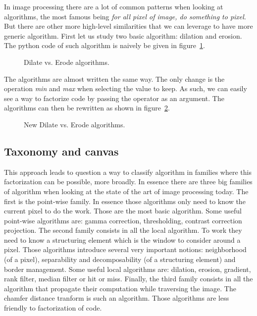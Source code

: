 In image processing there are a lot of common patterns when looking at algorithms, the most famous being \emph{for all
  pixel of image, do something to pixel}. But there are other more high-level similarities that we can leverage to have
more generic algorithm. First let us study two basic algorithm: dilation and erosion. The python code of such algorithm
is naively be given in figure~\ref{fig.erode.dilate}.

\begin{figure}[tbh]
  \centering
  \hfil
  \caption{Dilate vs. Erode algorithms.}
  \label{fig.erode.dilate}
\end{figure}

The algorithms are almost written the same way. The only change is the operation \emph{min} and \emph{max} when
selecting the value to keep. As such, we can easily see a way to factorize code by passing the operator as an argument.
The algorithms can then be rewritten as shown in figure~\ref{fig.erode.dilate.factorized}.

\begin{figure}[tbh]
  \centering
  \vfil
  \smallskip
  \hfil
  \caption{New Dilate vs. Erode algorithms.}
  \label{fig.erode.dilate.factorized}
\end{figure}

\subsection{Taxonomy and canvas}

This approach leads to question a way to classify algorithm in families where this factorization can be possible, more
broadly. In essence there are three big families of algorithm when looking at the state of the art of image processing
today. The first is the point-wise family. In essence those algorithms only need to know the current pixel to do the
work. Those are the most basic algorithm. Some useful point-wise algorithms are: gamma correction, thresholding,
contrast correction projection. The second family consists in all the local algorithm. To work they need to know a
structuring element which is the window to consider around a pixel. Those algorithms introduce several very important
notions: neighborhood (of a pixel), separability and decomposability (of a structuring element) and border management.
Some useful local algorithms are: dilation, erosion, gradient, rank filter, median filter or hit or miss. Finally, the
third family consists in all the algorithm that propagate their computation while traversing the image. The chamfer
distance tranform is such an algorithm. Those algorithms are less friendly to factorization of code.

